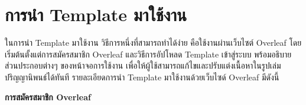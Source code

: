\section{การนำ Template มาใช้งาน}
\hspace*{1.5em}
ในการนำ Template มาใช้งาน วิธีการหนึ่งที่สามารถทำได้ง่าย คือใช้งานผ่านเว็บไซต์ Overleaf โดยเริ่มต้นตั้งแต่การสมัครสมาชิก Overleaf และวิธีการอัปโหลด Template เข้าสู่ระบบ พร้อมอธิบายส่วนประกอบต่างๆ ของหน้าจอการใช้งาน เพื่อให้ผู้ใช้สามารถแก้ไขและปรับแต่งเนื้อหาในรูปเล่มปริญญานิพนธ์ได้ทันที รายละเอียดการนำ Template มาใช้งานด้วยเว็บไซด์ Overleaf มีดังนี้ 

\vspace{0.5em}
\textbf{การสมัครสมาชิก Overleaf}
\vspace{0.5em}

